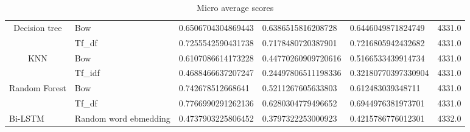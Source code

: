 \begin{table}[h!]
{\begin{tabular}{@{}clllll@{}}
\multicolumn{1}{|c|}{\multirow{2}{*}{Decision tree}} &
  \multicolumn{1}{l|}{Bow} &
  \multicolumn{1}{l|}{0.6506704304869443} &
  \multicolumn{1}{l|}{0.6386515816208728} &
  \multicolumn{1}{l|}{0.6446049871824749} &
  \multicolumn{1}{l|}{4331.0} \\ \cmidrule(l){2-6} 
\multicolumn{1}{|c|}{} &
  \multicolumn{1}{l|}{Tf\_df} &
  \multicolumn{1}{l|}{0.7255542590431738} &
  \multicolumn{1}{l|}{0.7178480720387901} &
  \multicolumn{1}{l|}{0.7216805942432682} &
  \multicolumn{1}{l|}{4331.0} \\ \midrule
\multicolumn{1}{|c|}{\multirow{2}{*}{KNN}} &
  \multicolumn{1}{l|}{Bow} &
  \multicolumn{1}{l|}{0.6107086614173228} &
  \multicolumn{1}{l|}{0.44770260909720616} &
  \multicolumn{1}{l|}{0.5166533439914734} &
  \multicolumn{1}{l|}{4331.0} \\ \cmidrule(l){2-6} 
\multicolumn{1}{|c|}{} &
  \multicolumn{1}{l|}{Tf\_idf} &
  \multicolumn{1}{l|}{0.4688466637207247} &
  \multicolumn{1}{l|}{0.24497806511198336} &
  \multicolumn{1}{l|}{0.32180770397330904} &
  \multicolumn{1}{l|}{4331.0} \\ \midrule
\multicolumn{1}{|c|}{\multirow{2}{*}{Random Forest}} &
  \multicolumn{1}{l|}{Bow} &
  \multicolumn{1}{l|}{0.742678512668641} &
  \multicolumn{1}{l|}{0.5211267605633803} &
  \multicolumn{1}{l|}{0.612483039348711} &
  \multicolumn{1}{l|}{4331.0} \\ \cmidrule(l){2-6} 
\multicolumn{1}{|c|}{} &
  \multicolumn{1}{l|}{Tf\_df} &
  \multicolumn{1}{l|}{0.7766990291262136} &
  \multicolumn{1}{l|}{0.6280304779496652} &
  \multicolumn{1}{l|}{0.6944976381973701} &
  \multicolumn{1}{l|}{4331.0} \\ \midrule
\multicolumn{1}{|l|}{Bi-LSTM} &
  \multicolumn{1}{l|}{Random word ebmedding} &
  \multicolumn{1}{l|}{0.4737903225806452} &
  \multicolumn{1}{l|}{0.3797322253000923} &
  \multicolumn{1}{l|}{0.4215786776012301} &
  \multicolumn{1}{l|}{4332.0} \\ \bottomrule
\end{tabular}%
}
\caption{Micro average scores}
\label{tab:Micro-average}
\end{table}

